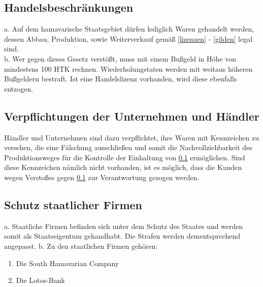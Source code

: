 \documentclass{article}
\begin{document}
\subsection{Handelsbeschränkungen}\label{beschraenkungen}
a. Auf dem hamavarische Staatsgebiet dürfen lediglich Waren gehandelt werden, dessen Abbau, Produktion, sowie Weiterverkauf gemäß \ref{lizenzen} - \ref{gilden} legal sind.\\
b. Wer gegen dieses Gesetz verstößt, muss mit einem Bußgeld in Höhe von mindestens 100 HTK rechnen. Wiederholungstaten werden mit weitaus höheren Bußgeldern bestraft. Ist eine Handelslizenz vorhanden, wird diese ebenfalls entzogen.

\subsection{Verpflichtungen der Unternehmen und Händler}
Händler und Unternehmen sind dazu verpflichtet, ihre Waren mit Kennzeichen zu versehen, die eine Fälschung ausschließen und somit die Nachvollziehbarkeit des Produktionsweges für die Kontrolle der Einhaltung von \ref{beschraenkungen} ermöglichen. Sind diese Kennzeichen nämlich nicht vorhanden, ist es möglich, dass die Kunden wegen Verstoßes gegen \ref{beschraenkungen} zur Verantwortung gezogen werden.

\subsection{Schutz staatlicher Firmen}
a. Staatliche Firmen befinden sich unter dem Schutz des Staates und werden somit als Staatseigentum gehandhabt. Die Strafen werden dementsprechend angepasst.
b. Zu den staatlichen Firmen gehören:
\begin{enumerate}
	\item Die South Hamavarian Company
	\item Die Lotos-Bank
\end{enumerate}
\end{document}
